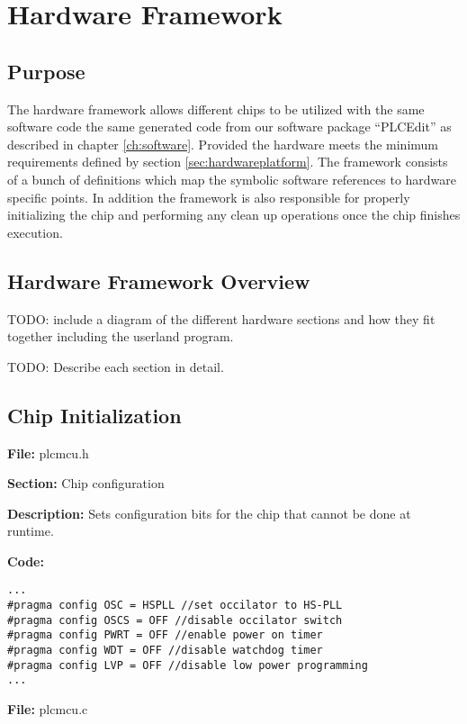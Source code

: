 \section{Hardware Framework}
\label{sec:hardwareframework}

\subsection{Purpose}
The hardware framework allows different chips to be utilized with the same software code the same generated code from our software package ``PLCEdit'' as described in chapter \ref{ch:software}. Provided the hardware meets the minimum requirements defined by section \ref{sec:hardwareplatform}. The framework consists of a bunch of definitions which map the symbolic software references to hardware specific points. In addition the framework is also responsible for properly initializing the chip and performing any clean up operations once the chip finishes execution.


\subsection{Hardware Framework Overview}
TODO: include a diagram of the different hardware sections and how they fit together including the userland program.


TODO: Describe each section in detail.


\subsection{Chip Initialization} 
\textbf{File:} plcmcu.h

\textbf{Section:} Chip configuration 

\textbf{Description:} Sets configuration bits for the chip that cannot be done at runtime.

\textbf{Code:}
\begin{minipage}{\textwidth}
\begin{lstlisting}[frame=single]
...
#pragma config OSC = HSPLL //set occilator to HS-PLL
#pragma config OSCS = OFF //disable occilator switch
#pragma config PWRT = OFF //enable power on timer
#pragma config WDT = OFF //disable watchdog timer
#pragma config LVP = OFF //disable low power programming
...
\end{lstlisting}
\end{minipage}

\textbf{File:} plcmcu.c

